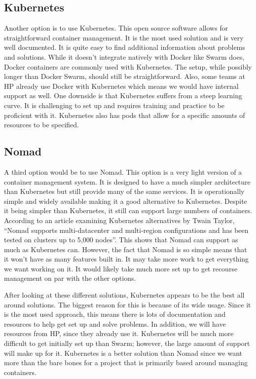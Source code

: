 \documentclass[onecolumn, draftclsnofoot,10pt, compsoc]{IEEEtran}
\begin{document}
\subsection{Kubernetes}
Another option is to use Kubernetes. This open source software allows for straightforward container management. It is the most used solution and is very well documented. It is quite easy to find additional information about problems and solutions. While it doesn't integrate natively with Docker like Swarm does, Docker containers are commonly used with Kubernetes. The setup, while possibly longer than Docker Swarm, should still be straightforward. Also, some teams at HP already use Docker with Kubernetes which means we would have internal support as well. One downside is that Kubernetes suffers from a steep learning curve. It is challenging to set up and requires training and practice to be proficient with it.\cite{kub} Kubernetes also has pods that allow for a specific amounts of resources to be specified.\cite{kub2}

\subsection{Nomad}
A third option would be to use Nomad. This option is a very light version of a container management system. It is designed to have a much simpler architecture than Kubernetes but still provide many of the same services. It is operationally simple and widely available making it a good alternative to Kubernetes. Despite it being simpler than Kubernetes, it still can support large numbers of containers. According to an article examining Kubernetes alternatives by Twain Taylor, “Nomad supports multi-datacenter and multi-region configurations and has been tested on clusters up to 5,000 nodes”.\cite{kub} This shows that Nomad can support as much as Kubernetes can. However, the fact that Nomad is so simple means that it won't have as many features built in. It may take more work to get everything we want working on it. It would likely take much more set up to get recourse management on par with the other options.

\par
After looking at these different solutions, Kubernetes appears to be the best all around solutions. The biggest reason for this is because of its wide usage. Since it is the most used approach, this means there is lots of documentation and resources to help get set up and solve problems. In addition, we will have resources from HP, since they already use it. Kubernetes will be much more difficult to get initially set up than Swarm; however, the large amount of support will make up for it. Kubernetes is a better solution than Nomad since we want more than the bare bones for a project that is primarily based around managing containers. 
\end{document}
